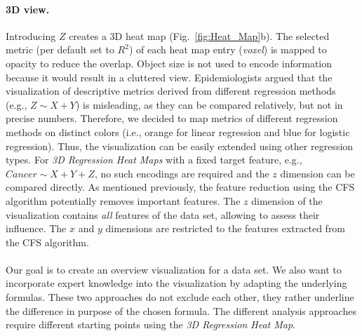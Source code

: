 \documentclass[journal]{style/vgtc} 			          %
\begin{document}
\paragraph{3D view.}
Introducing $Z$ creates a 3D heat map (Fig.~\ref{fig:Heat_Map}b).
The selected metric (per default set to $R^2$) of each heat map entry (\emph{voxel}) is mapped to opacity to reduce the overlap.
Object size is not used to encode information because it would result in a cluttered view.
Epidemiologists argued that the visualization of descriptive metrics derived from different regression methods (e.g., $Z \sim X + Y$) is misleading, as they can be compared relatively, but not in precise numbers.
Therefore, we decided to map metrics of different regression methods on distinct colors (i.e., orange for linear regression and blue for logistic regression).
Thus, the visualization can be easily extended using other regression types.
For \emph{3D Regression Heat Maps} with a fixed target feature, e.g., $Cancer \sim X + Y + Z$, no such encodings are required and the $z$ dimension can be compared directly.
As mentioned previously, the feature reduction using the CFS algorithm potentially removes important features. %
The $z$ dimension of the visualization contains \emph{all} features of the data set, allowing to assess their influence.
The $x$ and $y$ dimensions are restricted to the features extracted from the CFS algorithm.
\\\\
Our goal is to create an overview visualization for a data set.
We also want to incorporate expert knowledge into the visualization by adapting the underlying formulas.
These two approaches do not exclude each other, they rather underline the difference in purpose of the chosen formula.
The different analysis approaches require different starting points using the \emph{3D Regression Heat Map}.
\end{document}
